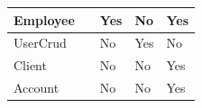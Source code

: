\documentclass[12pt]{article}
\begin{document}
\begin{table}[H]
\begin{tabular}{|l|l|l|l|l|}
Employee            &                  & Yes                                                             & No                                                               & Yes                                                                                                    \\ \hline
UserCrud            &                  & No                                                              & Yes                                                              & No                                                                                                     \\ \hline
Client              &                  & No                                                              & No                                                               & Yes                                                                                                    \\ \hline
Account             &                  & No                                                              & No                                                               & Yes                                                                                                    \\ \hline


\end{tabular}
\end{table}
\end{document}
